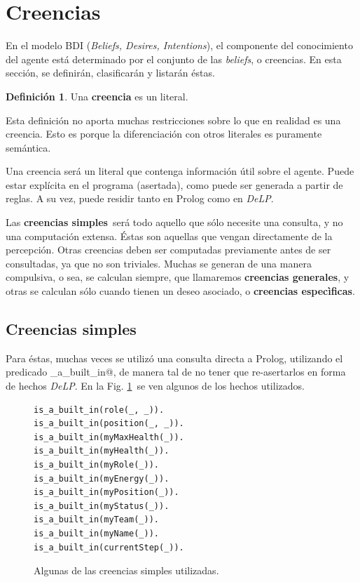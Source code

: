 \documentclass[oneside]{book}
\theoremstyle{definition}
\newtheorem{definicion}{Definición}[section]
\theoremstyle{example}
\newcommand{\DLP}{\mbox{\textit{DeLP}}}
\begin{document}
\section{Creencias}

\label{sec:creencias}

En el modelo BDI (\textit{Beliefs, Desires, Intentions}), el componente del conocimiento
del agente está determinado por el conjunto de las \textit{beliefs}, o creencias. En esta
sección, se definirán, clasificarán y listarán éstas.

\begin{definicion}
	Una \textbf{creencia} es un literal.
\end{definicion}

Esta definición no aporta muchas restricciones sobre lo que en realidad es una creencia.
Esto es porque la diferenciación con otros literales es puramente semántica.

Una creencia será un literal que contenga información útil sobre el agente. Puede estar
explícita en el programa (asertada), como puede ser generada a partir de reglas. A su vez,
puede residir tanto en Prolog como en \DLP.

Las \textbf{creencias simples}\ será todo aquello que sólo necesite una consulta, y no
una computación extensa. Éstas son aquellas que vengan directamente de la percepción. 
Otras creencias deben ser computadas previamente antes de ser consultadas, ya que no
son triviales. Muchas se generan de una manera compulsiva, o sea, se calculan siempre,
que llamaremos \textbf{creencias generales},
y otras se calculan sólo cuando tienen un deseo asociado, o \textbf{creencias 
especìficas}.


\subsection{Creencias simples}


Para éstas, muchas veces se utilizó una consulta directa a Prolog,
utilizando el predicado \verb@is_a_built_in@, de manera tal de no tener que 
re-asertarlos en forma de hechos \DLP. En la Fig. \ref{fig:creenciasSimples}\ se ven
algunos de los hechos utilizados.

\begin{figure}
\begin{verbatim}
is_a_built_in(role(_, _)).
is_a_built_in(position(_, _)).
is_a_built_in(myMaxHealth(_)).
is_a_built_in(myHealth(_)).
is_a_built_in(myRole(_)).
is_a_built_in(myEnergy(_)).
is_a_built_in(myPosition(_)).
is_a_built_in(myStatus(_)).
is_a_built_in(myTeam(_)).
is_a_built_in(myName(_)).
is_a_built_in(currentStep(_)).
\end{verbatim}
\caption{Algunas de las creencias simples utilizadas.}
\label{fig:creenciasSimples}
\end{figure}
\end{document}
